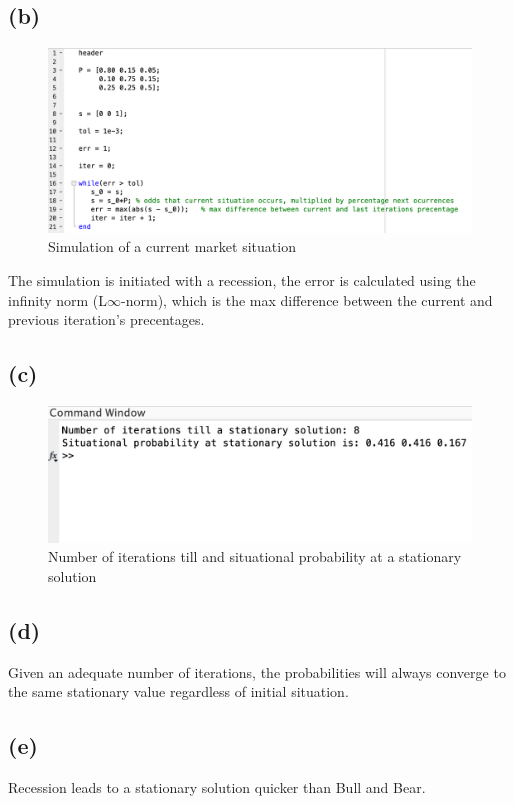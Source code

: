 \documentclass{article}
\begin{document}
\subsection{(b)}
\begin{figure}[H]
        \includegraphics[width=\linewidth]{./imgs/1b.png}
        \caption{Simulation of a current market situation}
\end{figure}
The simulation is initiated with a recession, the error is calculated using the infinity norm (L$\infty$-norm), which is the max difference between the current and previous iteration's precentages.

\subsection{(c)}
\begin{figure}[H]
    \includegraphics[width=\linewidth]{./imgs/1c.png}
    \caption{Number of iterations till and situational probability at a stationary solution}
\end{figure}

\subsection{(d)}
Given an adequate number of iterations, the probabilities will always converge to the same stationary value regardless of initial situation.

\subsection{(e)}
Recession leads to a stationary solution quicker than Bull and Bear.
\end{document}

